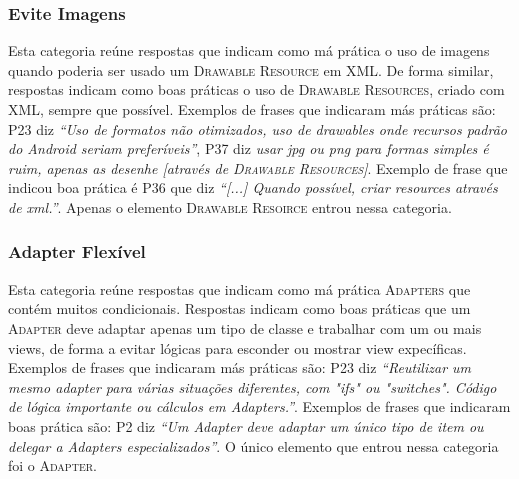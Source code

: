 \subsubsection{Evite Imagens}
Esta categoria re\'une respostas que indicam como m\'a pr\'atica o uso de imagens quando poderia ser usado um \textsc{Drawable Resource} em XML. De forma similar, respostas indicam como boas pr\'aticas o uso de \textsc{Drawable Resources}, criado com XML, sempre que poss\'ivel. Exemplos de frases que indicaram m\'as pr\'aticas s\~ao: P23 diz \textit{``Uso de formatos n\~ao otimizados, uso de drawables onde recursos padr\~ao do Android seriam prefer\'iveis''}, P37 diz \textit{usar jpg ou png para formas simples \'e ruim, apenas as desenhe [atrav\'es de \textsc{Drawable Resources}]}. Exemplo de frase que indicou boa pr\'atica \'e P36 que diz \textit{``[...] Quando poss\'ivel, criar resources atrav\'es de xml.''}. Apenas o elemento \textsc{Drawable Resoirce} entrou nessa categoria. 

\subsubsection{Adapter Flex\'ivel}
Esta categoria re\'une respostas que indicam como m\'a pr\'atica \textsc{Adapters} que cont\'em muitos condicionais. Respostas indicam como boas pr\'aticas que um \textsc{Adapter} deve adaptar apenas um tipo de classe e trabalhar com um ou mais views, de forma a evitar l\'ogicas para esconder ou mostrar view expec\'ificas. Exemplos de frases que indicaram m\'as pr\'aticas s\~ao: P23 diz \textit{``Reutilizar um mesmo adapter para v\'arias situa\c{c}\~oes diferentes, com "ifs" ou "switches". C\'odigo de l\'ogica importante ou c\'alculos em Adapters.''}. Exemplos de frases que indicaram boas pr\'atica s\~ao: P2 diz \textit{``Um Adapter deve adaptar um único tipo de item ou delegar a Adapters especializados''}. O único elemento que entrou nessa categoria foi o \textsc{Adapter}. 


